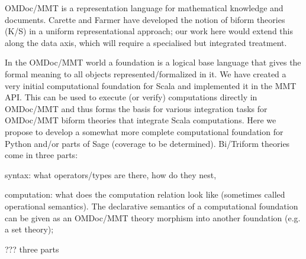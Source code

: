 \begin{workpackage}[id=dksbases,wphases=1-48!.5,
  title=Data/Knowledge/Software-Bases,lead=JU,
  ZHRM=12,JURM=36,USHRM=12,UWRM=3,SARM=10]
\begin{tasklist}
\begin{task}[id=data-design,lead=JU,partners={ZH,US,SA,UW},
  title={Formulation of requirements and design of new  infrastructure when appropriate}]

\end{task}

\begin{task}[title=Triform Theories in OMDoc/MMT,id=data-triform,
  lead=JU,partners={ZH}]
OMDoc/MMT is a representation language for mathematical knowledge and documents. Carette and Farmer have developed the notion of biform theories (K/S) in a uniform representational approach; our work here would extend this along the data axis, which will require a specialised but integrated treatment.
\end{task}

\begin{task}[title=Computational Foundation for Python/Sage (or some CAS),
  id=data-foundationCAS,lead=JU,partners={ZH,SA}]
In the OMDoc/MMT world a foundation is a logical base language that gives the formal meaning to all objects represented/formalized in it. We have created a very initial computational foundation for Scala and implemented it in the MMT API. This can be used to execute (or verify) computations directly in OMDoc/MMT and thus forms the basis for various integration tasks for OMDoc/MMT biform theories that integrate Scala computations. Here we propose to develop a somewhat more complete computational foundation for Python and/or parts of Sage (coverage to be determined). Bi/Triform theories come in three parts:
\begin{compactitem}
\item syntax: what operators/types are there, how do they nest, 
\item computation:  what does the computation relation look like (sometimes called operational semantics). The declarative semantics of a computational foundation can be given as an OMDoc/MMT theory morphism into another foundation (e.g. a set theory);
\item ??? three parts
\end{compactitem}
\end{task}


\end{tasklist}
\end{workpackage}
